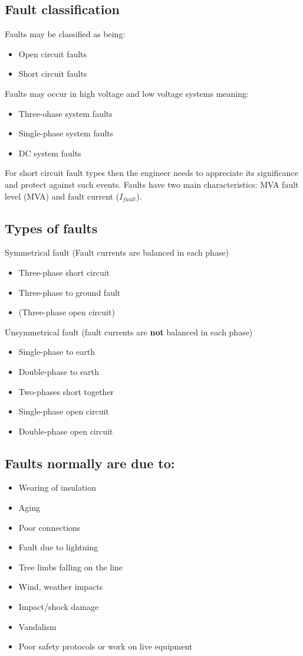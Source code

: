 \subsection{Fault classification}
Faults may be classified as being:
\begin{itemize}
	\item Open circuit faults
	\item Short circuit faults
\end{itemize}
Faults may occur in high voltage and low voltage systems meaning:
\begin{itemize}
	\item Three-ohase system faults
	\item Single-phase system faults
	\item DC system faults
\end{itemize}
For short circuit fault types then the engineer needs to appreciate its significance and protect against such events. Faults have two main characteristics: MVA fault level (\si{MVA}) and fault current ($I_{fault}$).
\subsection{Types of faults}
Symmetrical fault (Fault currents are balanced in each phase)
\begin{itemize}
	\item Three-phase short circuit
	\item Three-phase to ground fault
	\item (Three-phase open circuit)
\end{itemize}
Unsymmetrical fault (fault currents are \textbf{not} balanced in each phase)
\begin{itemize}
	\item Single-phase to earth
	\item Double-phase to earth
	\item Two-phases short together
	\item Single-phase open circuit
	\item Double-phase open circuit
\end{itemize}
\subsection{Faults normally are due to:}
\begin{itemize}
	\item Wearing of insulation
	\item Aging
	\item Poor connections
	\item Fault due to lightning
	\item Tree limbs falling on the line
	\item Wind, weather impacts
	\item Impact/shock damage
	\item Vandalism
	\item Poor safety protocols or work on live equipment
\end{itemize}
